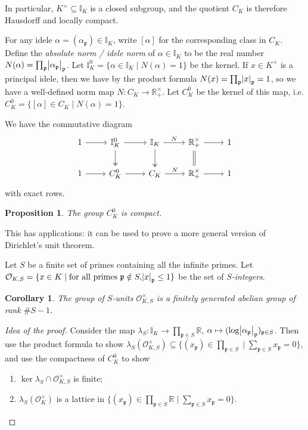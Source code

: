 \documentclass[11pt]{article}
\theoremstyle{definition}
\theoremstyle{plain}
\newtheorem{proposition}[definition]{Proposition}
\newtheorem{corollary}[definition]{Corollary}
\theoremstyle{remark}
\newcommand{\II}{\mathbb{I}}
\newcommand{\RR}{\mathbb{R}}
\newcommand{\cO}{\mathcal{O}}
\newcommand{\fp}{\mathfrak{p}}
\begin{document}
In particular, $K^\times \subseteq \II_K$ is a closed subgroup, and the quotient $C_K$ is therefore Hausdorff and locally compact. %

For any idele $\alpha = (\alpha_\fp) \in \II_K$, write $[\alpha]$ for the corresponding class in $C_K$. Define the \emph{absolute norm / idele norm} of $\alpha \in \II_K$ to be the real number $N(\alpha) = \prod_{\fp} \abs{\alpha_\fp}_\fp$. Let $\II_K^0 = \{\alpha \in \II_K \mid N(\alpha) = 1\}$ be the kernel. If $x \in K^\times$ is a principal idele, then we have by the product formula $N(x) = \prod_\fp \abs{x}_\fp = 1$, so we have a well-defined norm map $N : C_K \to \RR^\times_+$. Let $C_K^0$ be the kernel of this map, i.e. $C_K^0 = \{[\alpha] \in C_K \mid N(\alpha) = 1\}$.

{\color{blue}
    We have the commutative diagram
    \begin{equation*}
        \begin{tikzcd}
            1 \arrow[r] & \II_K^0 \arrow[r] \arrow[d, twoheadrightarrow] & \II_K \arrow[r, "N"] \arrow[d, twoheadrightarrow] & \RR_+^\times \arrow[r] \arrow[d, equal] & 1\\
            1 \arrow[r] & C_K^0 \arrow[r] & C_K \arrow[r, "N"] & \RR_+^\times \arrow[r] & 1
        \end{tikzcd}
    \end{equation*}
    with exact rows.
}

\begin{proposition}\label{prop:9_12}
    The group $C_K^0$ is compact.
\end{proposition}

This has applications: it can be used to prove a more general version of Dirichlet's unit theorem.

Let $S$ be a finite set of primes containing all the infinite primes. Let $\cO_{K,S} = \{x \in K \mid \text{for all primes } \fp \notin S, \abs{x}_\fp \le 1\}$ be the set of \emph{$S$-integers}.

\begin{corollary}\label{cor:9_13}
    The group of $S$-units $\cO_{K,S}^\times$ is a finitely generated abelian group of rank $\#S - 1$.
\end{corollary}
\begin{proof}[Idea of the proof]
    Consider the map $\lambda_S : \II_K \to \prod_{\fp \in S} \RR$, $\alpha \mapsto (\log \abs{\alpha_\fp}_\fp)_{\fp \in S}$. Then use the product formula to show $\lambda_S(\cO_{K,S}^\times) \subseteq \{(x_\fp) \in \prod_{\fp \in S} \mid \sum_{\fp \in S} x_\fp = 0\}$, and use the compactness of $C_K^0$ to show
    \begin{enumerate}[label=\roman*)]
        \item $\ker \lambda_S \cap \cO_{K,S}^\times$ is finite;
        \item $\lambda_S(\cO_K^\times)$ is a lattice in $\{(x_\fp) \in \prod_{\fp \in S} \RR \mid \sum_{\fp \in S} x_\fp = 0\}$. \qedhere
    \end{enumerate}
\end{proof}
\end{document}
